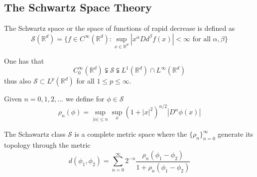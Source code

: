 \documentclass{article}
\newcommand{\RR}{\mathbb{R}}
\newcommand{\Sch}{\mathcal{S}}
\begin{document}
\subsection{The Schwartz Space Theory}
\begin{principle}
  The Schwartz space or the space of functions of rapid decrease is defined as
  \begin{equation*}
    \Sch(\RR^d) = \{f \in C^\infty(\RR^d): \sup_{x \in \RR^d} |x^\alpha Dd^\beta f(x)| < \infty \text{ for all $\alpha, \beta$}\}
  \end{equation*}
\end{principle}

\begin{proposition}
  One has that
  \begin{equation*}
    C_0^\infty(\RR^d) \subsetneqq \Sch \subsetneqq L^1(\RR^d) \cap L^\infty(\RR^d)
  \end{equation*}
  thus also $\Sch \subset L^p(\RR^d)$ for all $1 \leq p \leq \infty$.
\end{proposition}


\begin{principle}
  Given $n=0,1,2,\dots$ we define for $\phi \in \Sch$
  \begin{equation*}
    \rho_n(\phi) = \sup_{|\alpha| \leq n}\sup_x (1 + |x|^2)^{n/2} |D^\alpha \phi(x)|
  \end{equation*}
\end{principle}

\begin{proposition}
  The Schawartz class $\Sch$ is a complete metric space where the $\{\rho_n\}_{n=0}^\infty$ generate its topology through the metric
  \begin{equation*}
    d(\phi_1,\phi_2) = \sum_{n=0}^\infty 2^{-n} \frac{\rho_n(\phi_1 - \phi_2)}{1 + \rho_n(\phi_1 - \phi_2)}
  \end{equation*}
\end{proposition}
\newpage





\end{document}
